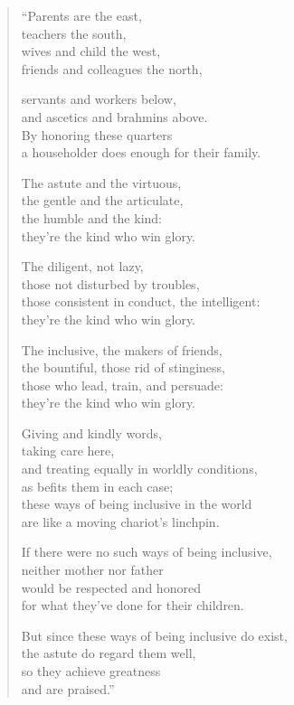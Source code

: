 \documentclass[12pt,openany]{book}%
\begin{document}
\begin{verse}%
“Parents are the east, \\
teachers the south, \\
wives and child the west, \\
friends and colleagues the north, 

servants and workers below, \\
and ascetics and brahmins above. \\
By honoring these quarters \\
a householder does enough for their family. 

The astute and the virtuous, \\
the gentle and the articulate, \\
the humble and the kind: \\
they’re the kind who win glory. 

The diligent, not lazy, \\
those not disturbed by troubles, \\
those consistent in conduct, the intelligent: \\
they’re the kind who win glory. 

The inclusive, the makers of friends, \\
the bountiful, those rid of stinginess, \\
those who lead, train, and persuade: \\
they’re the kind who win glory. 

Giving and kindly words, \\
taking care here, \\
and treating equally in worldly conditions, \\
as befits them in each case; \\
these ways of being inclusive in the world \\
are like a moving chariot’s linchpin. 

If there were no such ways of being inclusive, \\
neither mother nor father \\
would be respected and honored \\
for what they’ve done for their children. 

But since these ways of being inclusive do exist, \\
the astute do regard them well, \\
so they achieve greatness \\
and are praised.” 

%
\end{verse}
\end{document}
